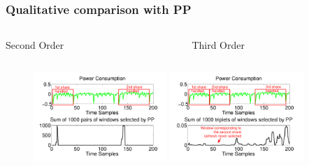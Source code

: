 \begin{frame}
\frametitle{Qualitative comparison with PP}
\vspace{-15pt}
\begin{columns}
\begin{column}{0.5\textwidth}
\centering 
Second Order
\end{column}
\begin{column}{0.5\textwidth}
\centering 
Third Order
\end{column}
\end{columns}
\begin{figure}
\includegraphics[width=0.45\textwidth]{figures/secondOrderPP.pdf} 
\includegraphics[width=0.45\textwidth]{figures/thirdOrderPP.pdf}\\
\end{figure}
%
\end{frame}
